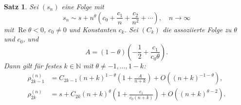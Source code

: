 \documentclass[a4paper,12pt]{article}
\numberwithin{equation}{section}
\newtheorem{satz}{Satz}[section]
\theoremstyle{remark}
\begin{document}
\begin{satz}\label{satz1}
Sei \((s_n)\) eine Folge mit
\[
s_n \sim s + n^{\theta} \left( c_0 + \frac{c_1}{n} + \frac{c_2}{n^2} + \cdots \right), \quad n \to \infty
\]
\textit{mit \(\operatorname{Re} \theta < 0\), \(c_0 \neq 0\) und Konstanten \(c_k\). Sei \((C_k)\) die assoziierte Folge zu \(\theta\) und \(c_0\), und}
\[
A = (1 - \theta) \left( -\frac{1}{2} + \frac{c_1}{c_0 \theta} \right).
\]
\textit{Dann gilt für festes \(k \in \mathbb{N}\) mit \(\theta \neq -1, \dots, 1 - k\):}
\begin{align*}
\rho_{2k-1}^{(n)} &= C_{2k-1} (n + k)^{1 - \theta} \left( 1 + \frac{A}{n + k} \right) + O\left( (n + k)^{-1 - \theta} \right), \\
\rho_{2k}^{(n)} &= s + C_{2k} (n + k)^{\theta} \left( 1 + \frac{c_1}{c_0 (n + k)} \right) + O\left( (n + k)^{\theta - 2} \right).
\end{align*}
\end{satz}
\end{document}
